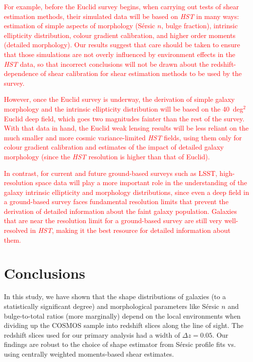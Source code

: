 \documentclass[twocolumn,useAMS,usenatbib]{mn2e}
\newcommand{\rachel}[1]{{\textcolor{red}{#1}}}
\newcommand{\sersic}{S\'{e}rsic }
\begin{document}
\rachel{For example, before the Euclid survey begins, when carrying
  out tests of shear estimation methods, their simulated data will be
  based on {\em HST} in many ways: estimation of simple aspects of
  morphology (\sersic $n$, bulge fraction), intrinsic ellipticity
  distribution, colour gradient calibration, and higher order moments
  (detailed morphology).  Our results suggest that care should be
  taken to ensure that those simulations are not overly influenced by
  environment effects in the {\em HST} data, so that incorrect
  conclusions will not be drawn about the redshift-dependence of shear
  calibration for shear estimation methods to be used by the survey.}

\rachel{However, once the Euclid survey is
  underway, the derivation of simple galaxy morphology and the
  intrinsic ellipticity distribution will be based on the 40~deg$^2$
  Euclid deep field, which goes two magnitudes fainter than the rest of
  the survey.  With that data in hand, the Euclid weak lensing
  results will be less reliant on the much smaller and more
  cosmic variance-limited {\em HST} fields, using them only for colour
  gradient calibration and estimates of the impact of detailed galaxy
  morphology (since the {\em HST} resolution is higher than that
  of Euclid).}

\rachel{In contrast, for current and future ground-based surveys such
  as LSST, high-resolution space data will play a more important role
  in the understanding of the galaxy 
  intrinsic ellipticity and morphology distributions, since even a deep
  field in a ground-based survey faces fundamental resolution limits
  that prevent the derivation of detailed information about the faint
  galaxy population.  Galaxies that are near the resolution limit for
  a ground-based survey are still very well-resolved in {\em HST},
  making it the best resource for detailed information about them.}

\section{Conclusions}
\label{S:summary}

In this study, we have shown that the shape distributions of galaxies
(to a statistically significant degree) and morphological parameters
like \sersic $n$ and bulge-to-total ratios (more marginally) depend on
the local environments when dividing up the COSMOS sample into
redshift slices along the line of sight.  The redshift slices used for
our primary analysis had
a width of $\Delta z=0.05$.  Our findings are robust to the choice of
shape estimator from \sersic profile fits vs. using centrally weighted
moments-based shear estimates.
\end{document}
